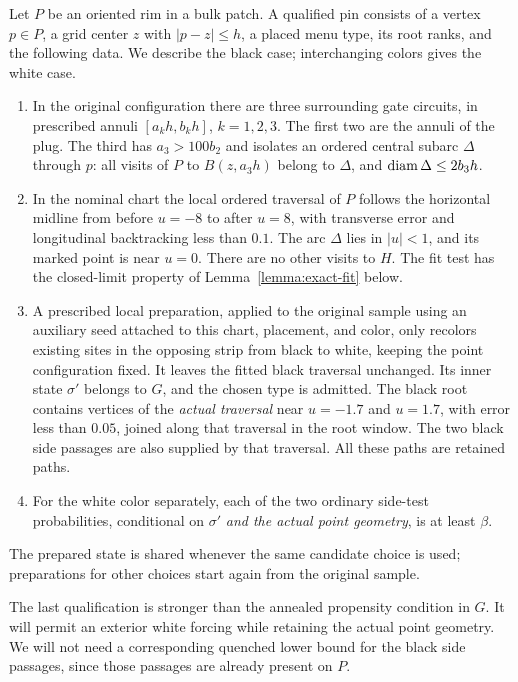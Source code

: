 \begin{definition}\label{pin:qualification}
Let $P$ be an oriented rim in a bulk patch.  A qualified pin consists of a
vertex $p\in P$, a grid center $z$ with $|p-z|\le h$, a placed menu type,
its root ranks, and the following data.  We describe the black case;
interchanging colors gives the white case.
\begin{enumerate}[label=(\roman*)]
\item In the original configuration there are three surrounding gate
circuits, in prescribed annuli $[a_kh,b_kh]$, $k=1,2,3$.  The first two
are the annuli of the plug.  The third has $a_3>100b_2$ and isolates an
ordered central subarc $\Delta$ through $p$: all visits of $P$ to
$B(z,a_3h)$ belong to $\Delta$, and $\operatorname{diam}\Delta\le2b_3h$.
\item In the nominal chart the local ordered traversal of $P$ follows
the horizontal midline from before $u=-8$ to after $u=8$, with transverse
error and longitudinal backtracking less than $0.1$.  The arc $\Delta$
lies in $|u|<1$, and its marked point is near $u=0$.  There are no other
visits to $H$.  The fit test has the closed-limit property of
Lemma~\ref{lemma:exact-fit} below.
\item A prescribed local preparation, applied to the original sample
using an auxiliary seed attached to this chart, placement, and color,
only recolors existing sites in the opposing strip from black to
white, keeping the point configuration fixed.  It leaves the
fitted black traversal unchanged.  Its inner state $\sigma'$ belongs
to $G$, and the chosen type is admitted.  The black root contains vertices of the
\emph{actual traversal} near $u=-1.7$ and $u=1.7$, with error less than
$0.05$, joined along that traversal in the root window.  The two black
side passages are also supplied by that traversal.  All these paths are
retained paths.
\item For the white color separately, each of the two ordinary side-test
probabilities, conditional on $\sigma'$ \emph{and the actual point
geometry}, is at least $\beta$.
\end{enumerate}
The prepared state is shared whenever the same candidate choice is used;
preparations for other choices start again from the original sample.
\end{definition}

The last qualification is stronger than the annealed propensity condition
in $G$.  It will permit an exterior white forcing while retaining the
actual point geometry.  We will not need a corresponding quenched lower
bound for the black side passages, since those passages are already
present on $P$.

